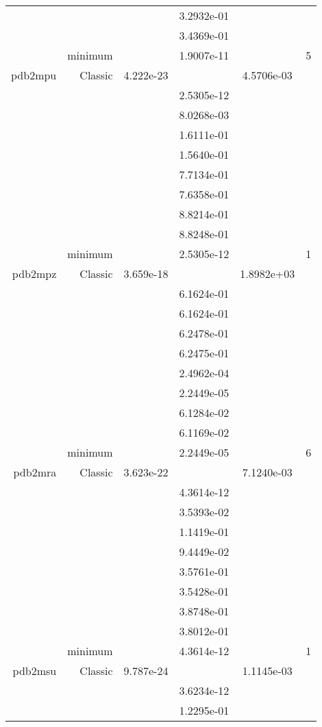 \begin{xltabular}{\textwidth}{r|rS[table-format=1.3e+2]S[table-format=1.4e+2]S[table-format=1.4e+2]S[table-format=-1.5]}
&  &  & 3.2932e-01 & & \\
&  &  & 3.4369e-01 & & \\
& minimum &  & 1.9007e-11 & & 5 \\  \addlinespace
pdb2mpu & Classic & 4.222e-23 &  & 4.5706e-03 & \\
&  &  & 2.5305e-12 & & \\
&  &  & 8.0268e-03 & & \\
&  &  & 1.6111e-01 & & \\
&  &  & 1.5640e-01 & & \\
&  &  & 7.7134e-01 & & \\
&  &  & 7.6358e-01 & & \\
&  &  & 8.8214e-01 & & \\
&  &  & 8.8248e-01 & & \\
& minimum &  & 2.5305e-12 & & 1 \\  \addlinespace
pdb2mpz & Classic & 3.659e-18 &  & 1.8982e+03 & \\
&  &  & 6.1624e-01 & & \\
&  &  & 6.1624e-01 & & \\
&  &  & 6.2478e-01 & & \\
&  &  & 6.2475e-01 & & \\
&  &  & 2.4962e-04 & & \\
&  &  & 2.2449e-05 & & \\
&  &  & 6.1284e-02 & & \\
&  &  & 6.1169e-02 & & \\
& minimum &  & 2.2449e-05 & & 6 \\  \addlinespace
pdb2mra & Classic & 3.623e-22 &  & 7.1240e-03 & \\
&  &  & 4.3614e-12 & & \\
&  &  & 3.5393e-02 & & \\
&  &  & 1.1419e-01 & & \\
&  &  & 9.4449e-02 & & \\
&  &  & 3.5761e-01 & & \\
&  &  & 3.5428e-01 & & \\
&  &  & 3.8748e-01 & & \\
&  &  & 3.8012e-01 & & \\
& minimum &  & 4.3614e-12 & & 1 \\  \addlinespace
pdb2msu & Classic & 9.787e-24 &  & 1.1145e-03 & \\
&  &  & 3.6234e-12 & & \\
&  &  & 1.2295e-01 & & \\

\end{xltabular}
